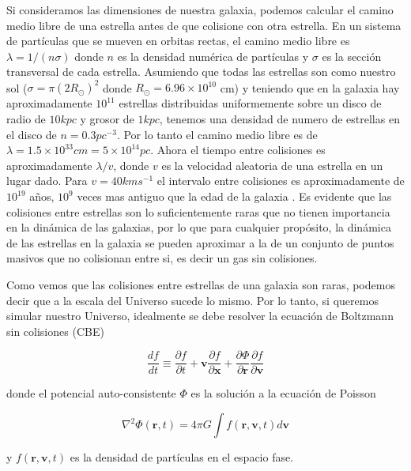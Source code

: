 Si consideramos las dimensiones de nuestra galaxia, podemos calcular el camino medio libre de una estrella antes de que colisione con otra estrella. En un sistema de partículas que se mueven en orbitas rectas, el camino medio libre es $\lambda = 1/(n\sigma)$ donde $n$ es la densidad numérica de partículas y $\sigma$ es la sección transversal de cada estrella. Asumiendo que todas las estrellas son como nuestro sol ($\sigma = \pi(2R_\odot)^2 $ donde $R_\odot = 6.96\times 10^{10}$ cm) y teniendo que en la galaxia hay aproximadamente $10^{11}$ estrellas distribuidas uniformemente sobre un disco de radio de $10 kpc$ y grosor de $1 kpc$, tenemos una densidad de numero de estrellas en el disco de $n=0.3pc^{-3}$. Por lo tanto el camino medio libre es de $\lambda = 1.5 \times 10^{33} cm = 5\times 10^{14}pc$. Ahora el tiempo entre colisiones es aproximadamente $\lambda / v$, donde $v$ es la velocidad aleatoria de una estrella en un lugar dado. Para $v=40km s^{-1}$ el intervalo entre colisiones es aproximadamente de $10^{19}$ años, $10^9$ veces mas antiguo que la edad de la galaxia \cite{Binney1988-rs}. Es evidente que las colisiones entre estrellas son lo suficientemente raras que no tienen importancia en la dinámica de las galaxias, por lo que para cualquier propósito, la dinámica de las estrellas en la galaxia se pueden aproximar a la de un conjunto de puntos masivos que no colisionan entre si, es decir un gas sin colisiones.

Como vemos que las colisiones entre estrellas de una galaxia son raras, podemos decir que a la escala del Universo sucede lo mismo. Por lo tanto, si queremos simular nuestro Universo, idealmente se debe resolver la ecuación de Boltzmann sin colisiones (CBE)

\begin{equation}
    \frac{d f}{d t} \equiv \frac{\partial f}{\partial t} + \mathbf{v}\frac{\partial f}{\partial \mathbf{x}} + \frac{\partial \Phi}{\partial \mathbf{r}} \frac{\partial f}{\partial \mathbf{v}}
    \label{eq:CBE}
\end{equation}

\noindent donde el potencial auto-consistente $\Phi$ es la solución a la ecuación de Poisson

\begin{equation}
    \nabla^2\Phi(\mathbf{r},t) = 4\pi G \int f(\mathbf{r},\mathbf{v},t)d\mathbf{v}
    \label{eq:PoissonSol}
\end{equation}

\noindent y $f(\mathbf{r},\mathbf{v},t)$ es la densidad de partículas en el espacio fase.

